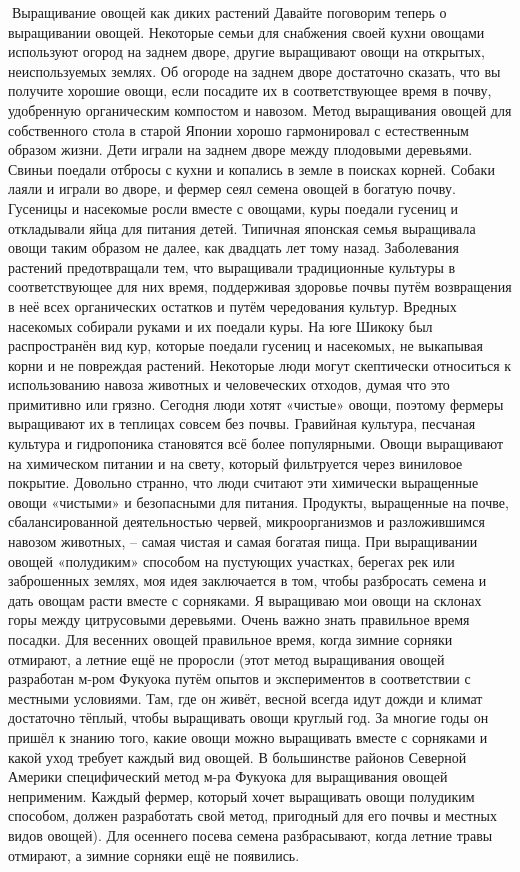\documentclass[a4paper]{book}
\begin{document}
Выращивание овощей как диких растений
Давайте поговорим теперь о выращивании овощей. Некоторые семьи для снабжения
своей кухни овощами используют огород на заднем дворе, другие выращивают овощи на
открытых, неиспользуемых землях.
Об огороде на заднем дворе достаточно сказать, что вы получите хорошие овощи, если
посадите их в соответствующее время в почву, удобренную органическим компостом и
навозом. Метод выращивания овощей для собственного стола в старой Японии хорошо
гармонировал с естественным образом жизни. Дети играли на заднем дворе между
плодовыми деревьями. Свиньи поедали отбросы с кухни и копались в земле в поисках
корней. Собаки лаяли и играли во дворе, и фермер сеял семена овощей в богатую почву.
Гусеницы и насекомые росли вместе с овощами, куры поедали гусениц и откладывали яйца
для питания детей.
Типичная японская семья выращивала овощи таким образом не далее, как двадцать лет
тому назад.
Заболевания растений предотвращали тем, что выращивали традиционные культуры в
соответствующее для них время, поддерживая здоровье почвы путём возвращения в неё всех
органических остатков и путём чередования культур. Вредных насекомых собирали руками и
их поедали куры. На юге Шикоку был распространён вид кур, которые поедали гусениц и
насекомых, не выкапывая корни и не повреждая растений.
Некоторые люди могут скептически относиться к использованию навоза животных и
человеческих отходов, думая что это примитивно или грязно. Сегодня люди хотят «чистые»
овощи, поэтому фермеры выращивают их в теплицах совсем без почвы. Гравийная культура,
песчаная культура и гидропоника становятся всё более популярными. Овощи выращивают на
химическом питании и на свету, который фильтруется через виниловое покрытие. Довольно
странно, что люди считают эти химически выращенные овощи «чистыми» и безопасными
для питания. Продукты, выращенные на почве, сбалансированной деятельностью червей,
микроорганизмов и разложившимся навозом животных, – самая чистая и самая богатая
пища.
При выращивании овощей «полудиким» способом на пустующих участках, берегах рек
или заброшенных землях, моя идея заключается в том, чтобы разбросать семена и дать
овощам расти вместе с сорняками. Я выращиваю мои овощи на склонах горы между
цитрусовыми деревьями.
Очень важно знать правильное время посадки. Для весенних овощей правильное время,
когда зимние сорняки отмирают, а летние ещё не проросли (этот метод выращивания овощей
разработан м-ром Фукуока путём опытов и экспериментов в соответствии с местными
условиями. Там, где он живёт, весной всегда идут дожди и климат достаточно тёплый, чтобы
выращивать овощи круглый год. За многие годы он пришёл к знанию того, какие овощи
можно выращивать вместе с сорняками и какой уход требует каждый вид овощей. В
большинстве районов Северной Америки специфический метод м-ра Фукуока для
выращивания овощей неприменим. Каждый фермер, который хочет выращивать овощи
полудиким способом, должен разработать свой метод, пригодный для его почвы и местных
видов овощей). Для осеннего посева семена разбрасывают, когда летние травы отмирают, а
зимние сорняки ещё не появились.
\end{document}
